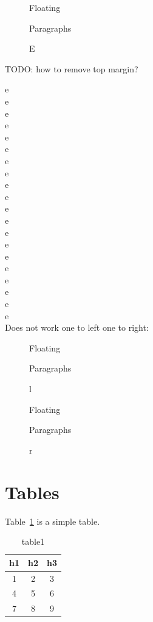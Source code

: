 \documentclass[12pt]{article}
\begin{document}
    \begin{figure}
      \begin{flushleft}
        Floating

        Paragraphs

        E
      \end{flushleft}
    \end{figure}

    TODO: how to remove top margin?

    e \\ e \\ e \\ e\\ e \\ e \\ e \\ e \\ e\\ e \\
    e \\ e \\ e \\ e\\ e \\ e \\ e \\ e \\ e\\ e \\

    Does not work one to left one to right:

    \begin{figure}
        Floating

        Paragraphs

        l
    \end{figure}

    \begin{figure}
        Floating

        Paragraphs

        r
    \end{figure}

\clearpage

\section{Tables}\label{table}

  Table~\ref{table1} is a simple table.

  \begin{table}[!htpb]
    \begin{tabular}{ccc}
      h1 & h2 & h3 \\
      \hline
      1 & 2 & 3 \\
      4 & 5 & 6 \\
      7 & 8 & 9 \\
    \end{tabular}
    \caption{table1}
    \label{table1}
  \end{table}
\end{document}
